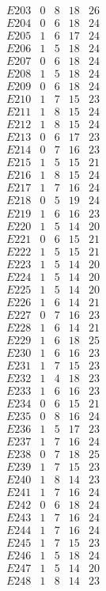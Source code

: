 \documentclass[12pt]{article}
\begin{document}
\begin{multicols}{3}
\begin{equation*}
\begin{array}{|c|ccc|c|}
E203&0&8&18&26\\
E204&0&6&18&24\\
E205&1&6&17&24\\
E206&1&5&18&24\\
E207&0&6&18&24\\
E208&1&5&18&24\\
E209&0&6&18&24\\
E210&1&7&15&23\\
E211&1&8&15&24\\
E212&1&8&15&24\\
E213&0&6&17&23\\
E214&0&7&16&23\\
E215&1&5&15&21\\
E216&1&8&15&24\\
E217&1&7&16&24\\
E218&0&5&19&24\\
E219&1&6&16&23\\
E220&1&5&14&20\\
E221&0&6&15&21\\
E222&1&5&15&21\\
E223&1&5&14&20\\
E224&1&5&14&20\\
E225&1&5&14&20\\
E226&1&6&14&21\\
E227&0&7&16&23\\
E228&1&6&14&21\\
E229&1&6&18&25\\
E230&1&6&16&23\\
E231&1&7&15&23\\
E232&1&4&18&23\\
E233&1&6&16&23\\
E234&0&6&15&21\\
E235&0&8&16&24\\
E236&1&5&17&23\\
E237&1&7&16&24\\
E238&0&7&18&25\\
E239&1&7&15&23\\
E240&1&8&14&23\\
E241&1&7&16&24\\
E242&0&6&18&24\\
E243&1&7&16&24\\
E244&1&7&16&24\\
E245&1&7&15&23\\
E246&1&5&18&24\\
E247&1&5&14&20\\
E248&1&8&14&23\\

\end{array}
\end{equation*}
\end{multicols}
\end{document}
